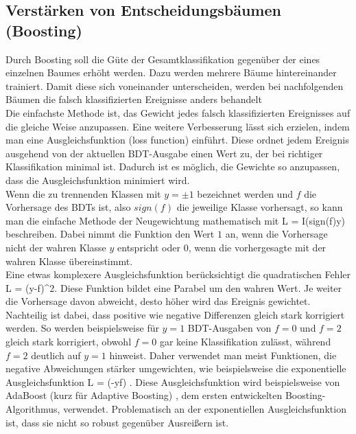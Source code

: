 \subsection{Verst\"arken von Entscheidungsb\"aumen (Boosting)}
\label{ch:Algorithmen:subsec:Boosting}

Durch Boosting soll die G\"ute der Gesamtklassifikation gegen\"uber der eines einzelnen Baumes erh\"oht werden. Dazu werden mehrere B\"aume hintereinander trainiert. Damit diese sich voneinander unterscheiden, werden bei nachfolgenden B\"aumen die falsch klassifizierten Ereignisse anders behandelt\\
Die einfachste Methode ist, das Gewicht jedes falsch klassifizierten Ereignisses auf die gleiche Weise anzupassen. Eine weitere Verbesserung l\"asst sich erzielen, indem man eine Ausgleichsfunktion (loss function) einf\"uhrt. Diese ordnet jedem Ereignis ausgehend von der aktuellen BDT-Ausgabe einen Wert zu, der bei richtiger Klassifikation minimal ist. Dadurch ist es m\"oglich, die Gewichte so anzupassen, dass die Ausgleichsfunktion minimiert wird.\\
Wenn die zu trennenden Klassen mit $y=\pm1$ bezeichnet werden und $f$ die Vorhersage des BDTs ist, also $sign(f)$ die jeweilige Klasse vorhersagt, so kann man die einfache Methode der Neugewichtung mathematisch mit
\beq
L = I(sign(f)\neq y)
\label{eq:missclass_loss}
\eeq
beschreiben. Dabei nimmt die Funktion den Wert $1$ an, wenn die Vorhersage nicht der wahren Klasse $y$ entspricht oder $0$, wenn die vorhergesagte mit der wahren Klasse \"ubereinstimmt.\\
Eine etwas komplexere Ausgleichsfunktion ber\"ucksichtigt die quadratischen Fehler
\beq
L = (y-f)^2.
\label{eq:squarederror_loss}
\eeq
Diese Funktion bildet eine Parabel um den wahren Wert. Je weiter die Vorhersage davon abweicht, desto h\"oher wird das Ereignis gewichtet. Nachteilig ist dabei, dass positive wie negative Differenzen gleich stark korrigiert werden. So werden beispielsweise f\"ur $y=1$ BDT-Ausgaben von $f=0$ und $f=2$ gleich stark korrigiert, obwohl $f=0$ gar keine Klassifikation zul\"asst, w\"ahrend $f=2$ deutlich auf $y=1$ hinweist. Daher verwendet man meist Funktionen, die negative Abweichungen st\"arker umgewichten, wie beispielsweise die exponentielle Ausgleichsfunktion
\beq
L = \exp(-y\cdot f)
\label{eq:exp_loss}.
\eeq
Diese Ausgleichsfunktion wird beispielsweise von AdaBoost (kurz f\"ur Adaptive Boosting) \cite{ADABoost}, dem ersten entwickelten Boosting-Algorithmus, verwendet. Problematisch an der exponentiellen Ausgleichsfunktion ist, dass sie nicht so robust gegen\"uber Ausrei\ss ern ist.\\
